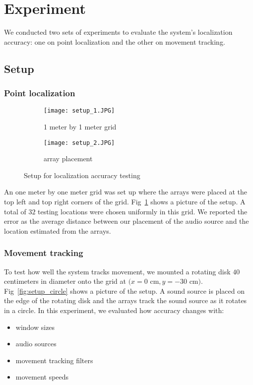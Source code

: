 \section{Experiment}
We conducted two sets of experiments to evaluate the system's localization accuracy: one on point localization and the other on movement tracking. 

\subsection{Setup}
\subsubsection{Point localization}

\begin{figure}[]
  \centering
  \begin{subfigure}[]{.2\textwidth}
    \texttt{[image: setup\_1.JPG]}
    \caption{1 meter by 1 meter grid}
  \end{subfigure}
  \begin{subfigure}[]{.2\textwidth}
    \texttt{[image: setup\_2.JPG]}
    \caption{array placement}
  \end{subfigure}
  \caption{Setup for localization accuracy testing}
  \label{fig:setup_point}
\end{figure}

An one meter by one meter grid was set up where the arrays were placed at the top left and top right corners of the grid. Fig~\ref{fig:setup_point} shows a picture of the setup. A total of $32$ testing locations were chosen uniformly in this grid. We reported the error as the average distance between our placement of the audio source and the location estimated from the arrays.

\subsubsection{Movement tracking}
To test how well the system tracks movement, we mounted a rotating disk $40$ centimeters in diameter onto the grid at $(x=0$ cm$, y=-30$ cm$)$. Fig~\ref{fig:setup_circle} shows a picture of the setup. A sound source is placed on the edge of the rotating disk and the arrays track the sound source as it rotates in a circle. In this experiment, we evaluated how accuracy changes with:
\begin{itemize}
\item window sizes
\item audio sources
\item movement tracking filters
\item movement speeds
\end{itemize}

